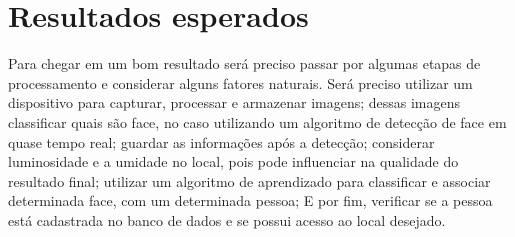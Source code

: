 
\chapter{Resultados esperados}\label{cap:resultados}

Para chegar em um bom resultado será preciso passar por algumas etapas de 
processamento e considerar alguns fatores naturais. Será preciso utilizar 
um dispositivo para capturar, processar e armazenar imagens; dessas imagens 
classificar quais são face, no caso utilizando um algoritmo de detecção de 
face em quase tempo real; guardar as informações após a detecção; considerar 
luminosidade e a umidade no local, pois pode influenciar na qualidade do 
resultado final; utilizar um algoritmo de aprendizado para classificar e 
associar determinada face, com um determinada pessoa; E por fim, verificar 
se a pessoa está cadastrada no banco de dados e se possui acesso ao 
local desejado.